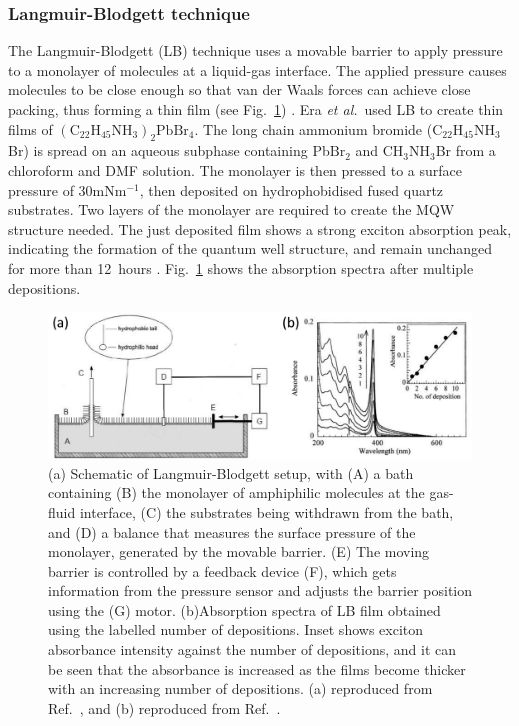 \subsubsection {Langmuir-Blodgett technique}
The Langmuir-Blodgett (LB) technique uses a movable barrier to apply pressure to a monolayer of molecules at a liquid-gas interface. The applied pressure causes molecules to be close enough so that van der Waals forces can achieve close packing, thus forming a thin film (see Fig.\ \ref{2Fig6}) \cite{Mitzi2001b}. Era \textit{et al.}\ used LB to create thin films of $(\textrm{C}_{22}\textrm{H}_{45}\textrm{NH}_3)_2\textrm{PbBr}_4$. The long chain ammonium bromide ($\textrm{C}_{22}\textrm{H}_{45}\textrm{NH}_3$Br) is spread on an aqueous subphase containing Pb$\textrm{Br}_2$ and $\textrm{CH}_3\textrm{NH}_3$Br from a chloroform and DMF solution. The monolayer is then pressed to a surface pressure of 30mN$\textrm{m}^{-1}$, then deposited on hydrophobidised fused quartz substrates. Two layers of the monolayer are required to create the MQW structure needed. The just deposited film shows a strong exciton absorption peak, indicating the formation of the quantum well structure, and remain unchanged for more than 12~hours \cite{Era2000}. Fig.~\ref{2Fig6} shows the absorption spectra after multiple depositions.
\begin{figure} [h]
\centering
\includegraphics[width=\textwidth]{Fig6}
\caption{(a) Schematic of Langmuir-Blodgett setup, with (A) a bath containing (B) the monolayer of amphiphilic molecules at the gas-fluid interface, (C) the substrates being withdrawn from the bath, and (D) a balance that measures the surface pressure of the monolayer, generated by the movable barrier. (E) The moving barrier is controlled by a feedback device (F), which gets information from the pressure sensor and adjusts the barrier position using the (G) motor. (b)Absorption spectra of LB film obtained using the labelled number of depositions. Inset shows exciton absorbance intensity against the number of depositions, and it can be seen that the absorbance is increased as the films become thicker with an increasing number of depositions. (a) reproduced from Ref.\ \cite{Mitzi2001b}, and (b) reproduced from Ref.~\cite{Era2000}.}
\label{2Fig6}
\end{figure}

